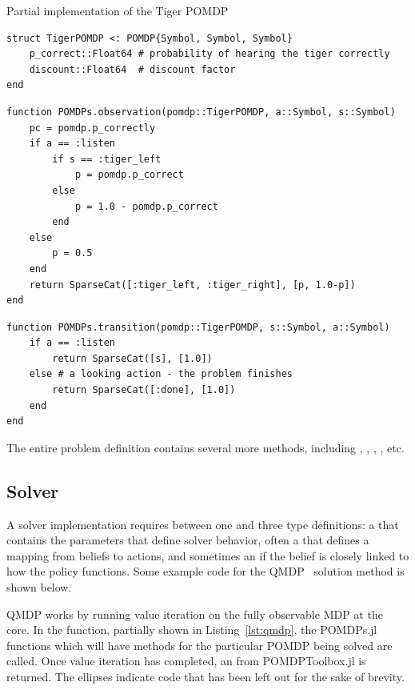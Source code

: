 \begin{lstfloat}
    \caption{Partial implementation of the Tiger POMDP}\label{lst:tiger}
\begin{lstlisting}
struct TigerPOMDP <: POMDP{Symbol, Symbol, Symbol}
    p_correct::Float64 # probability of hearing the tiger correctly
    discount::Float64  # discount factor
end
\end{lstlisting}

\begin{lstlisting}
function POMDPs.observation(pomdp::TigerPOMDP, a::Symbol, s::Symbol)
    pc = pomdp.p_correctly
    if a == :listen
        if s == :tiger_left
            p = pomdp.p_correct
        else
            p = 1.0 - pomdp.p_correct
        end
    else
        p = 0.5
    end
    return SparseCat([:tiger_left, :tiger_right], [p, 1.0-p])
end
\end{lstlisting}

\begin{lstlisting}
function POMDPs.transition(pomdp::TigerPOMDP, s::Symbol, a::Symbol)
    if a == :listen
        return SparseCat([s], [1.0]) 
    else # a looking action - the problem finishes
        return SparseCat([:done], [1.0])
    end
end
\end{lstlisting}
\end{lstfloat}

The entire problem definition contains several more methods, including , , , , etc.

\subsection{Solver} 

A solver implementation requires between one and three type definitions: a  that contains the parameters that define solver behavior, often a  that defines a mapping from beliefs to actions, and sometimes an  if the belief is closely linked to how the policy functions.
Some example code for the QMDP~\citep{littman1995learning} solution method is shown below.

QMDP works by running value iteration on the fully observable MDP at the core.
In the  function, partially shown in Listing~\ref{lst:qmdp}, the POMDPs.jl functions which will have methods for the particular POMDP being solved are called.
Once value iteration has completed, an  from POMDPToolbox.jl is returned.
The ellipses indicate code that has been left out for the sake of brevity.

